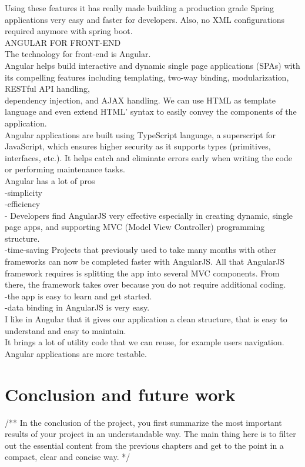 \documentclass{scrartcl}
\begin{document}
Using these features it has really made building a production grade Spring applications very easy and faster for developers. Also, no XML configurations required anymore with spring boot.\\

ANGULAR FOR FRONT-END \\
The technology for front-end is Angular.\\
Angular helps build interactive and dynamic single page applications (SPAs) with its compelling features including templating, two-way binding, modularization, RESTful API handling,\\ dependency injection, and AJAX handling. We can use HTML as template language and even extend HTML’ syntax to easily convey the components of the application.\\
Angular applications are built using TypeScript language, a superscript for JavaScript, which ensures higher security as it supports types (primitives, interfaces, etc.). It helps catch and eliminate errors early when writing the code or performing maintenance tasks.\\
Angular has a lot of pros\\
-simplicity\\
-efficiency\\
- Developers find AngularJS very effective especially in creating dynamic, single page apps, and supporting MVC (Model View Controller) programming structure.\\
-time-saving Projects that previously used to take many months with other frameworks can now be completed faster with AngularJS. All that AngularJS framework requires is splitting the app into several MVC components. From there, the framework takes over because you do not require additional coding.\\
-the app is easy to learn and get started.\\
-data binding in AngularJS is very easy.\\
I like in Angular that it gives our application a clean structure, that is easy to understand and easy to maintain.\\
It brings a lot of utility code that we can reuse, for example users navigation. Angular applications are more testable.\\



\section{Conclusion and future work}
/**
 In the conclusion of the project, you first summarize the most important results of your project in an understandable way. The main thing here is to filter out the essential content from the previous chapters and get to the point in a compact, clear and concise way.
*/
\lipsum[6-7]
\end{document}
